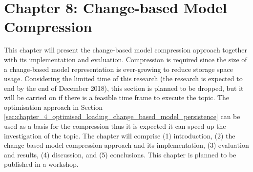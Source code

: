 \documentclass[12pt, a4paper]{report} \usepackage[titletoc]{appendix}
\begin{document}

\section{Chapter 8: Change-based Model Compression}
\label{sec:chapter_8_change_based_model_compression}
This chapter will present the change-based model compression approach together with its implementation and evaluation. Compression is required since the size of a change-based model representation is ever-growing to reduce storage space usage. Considering the limited time of this research (the research is expected to end by the end of December 2018), this section is planned to be dropped, but it will be carried on if there is a feasible time frame to execute the topic. The optimisation approach in Section \ref{sec:chapter_4_optimised_loading_change_based_model_persistence} can be used as a basis for the compression thus it is expected it can speed up the investigation of the topic. The chapter will comprise (1) introduction, (2) the change-based model compression approach and its implementation, (3) evaluation and results, (4) discussion, and (5) conclusions. This chapter is planned to be published in a workshop. 

\end{document}
